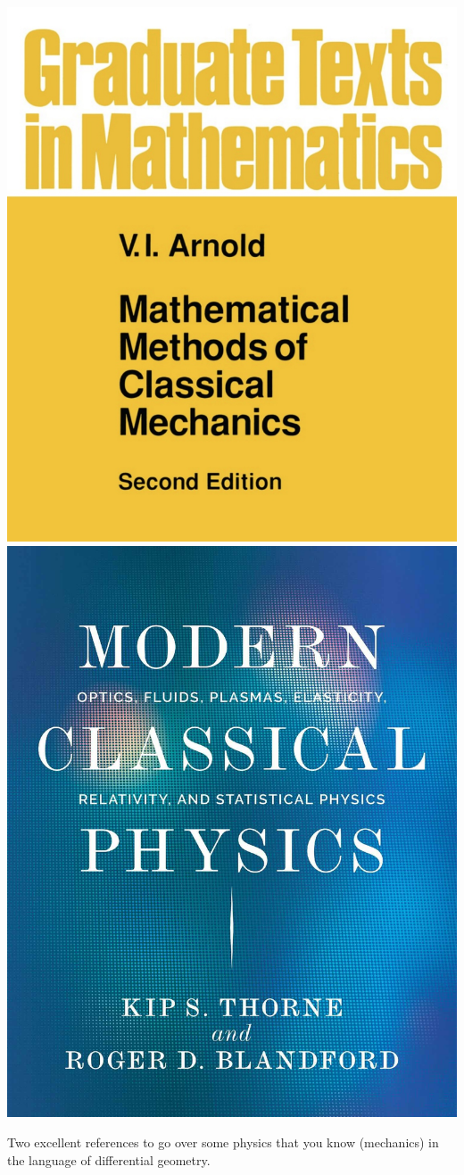 \documentclass[12pt, oneside]{report}    %
\begin{document}
\begin{marginfigure}%
    \includegraphics[width=.6\textwidth]{figures/Arnoldbook.jpg}\\
    \includegraphics[width=.6\textwidth]{figures/MCP_Thorne.jpg}
    \caption{Two excellent references to go over some physics that you know (mechanics) in the language of differential geometry.}
    \label{fig:figure:mathematical:physics:books}
\end{marginfigure}
\end{document}
